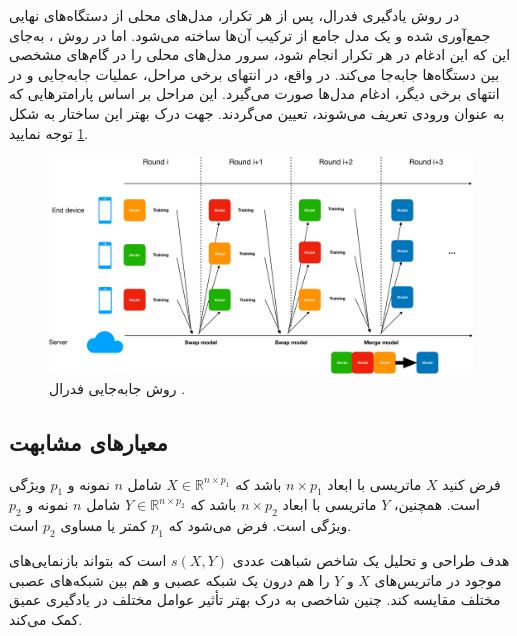 در روش‌ یادگیری فدرال، پس از هر تکرار، مدل‌های محلی از دستگاه‌های نهایی جمع‌آوری شده و یک مدل جامع از ترکیب آن‌ها ساخته می‌شود. اما در روش
%
، به‌جای این که این ادغام در هر تکرار انجام شود، سرور مدل‌های محلی را در گام‌های مشخصی بین دستگاه‌ها جابه‌جا می‌کند. در واقع، در انتهای برخی مراحل، عملیات جابه‌جایی و در انتهای برخی دیگر، ادغام مدل‌ها صورت می‌گیرد. این مراحل بر اساس پارامترهایی که به عنوان ورودی تعریف می‌شوند، تعیین می‌گردند.
جهت درک بهتر این ساختار به شکل
\ref{federated_swapping}
توجه نمایید.


\begin{figure}[t]
	\centering
	\includegraphics[scale=0.179]{images/chap4/federated_swapping.png}%
	\caption{%
		روش جابه‌جایی فدرال
		\cite{chiu2020semisupervised}%
		.
	}
	\label{federated_swapping}
	\centering
\end{figure}








\subsection{معیارهای مشابهت}

 فرض کنید \( X \) ماتریسی با ابعاد \( n \times p_1 \) باشد که \( X \in \mathbb{R}^{n \times p_1} \) شامل \( n \) نمونه و \( p_1 \) ویژگی است. همچنین، \( Y \) ماتریسی با ابعاد \( n \times p_2 \) باشد که \( Y \in \mathbb{R}^{n \times p_2} \) شامل \( n \) نمونه و \( p_2 \) ویژگی است. فرض می‌شود که \( p_1 \) کمتر یا مساوی \( p_2 \) است.
 
 
 هدف طراحی و تحلیل یک شاخص شباهت عددی \( s(X, Y) \) است که بتواند بازنمایی‌های%
 موجود در ماتریس‌های \( X \) و \( Y \) را هم درون یک شبکه عصبی و هم بین شبکه‌های عصبی مختلف مقایسه کند. چنین شاخصی به درک بهتر تأثیر عوامل مختلف در یادگیری عمیق کمک می‌کند.
 
